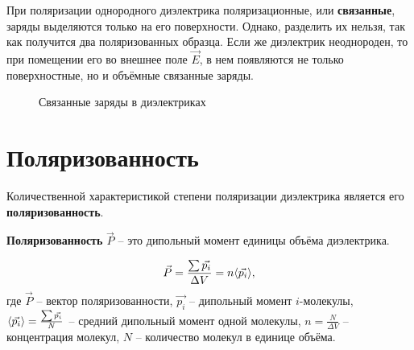     При поляризации однородного диэлектрика поляризационные, или
    \textbf{связанные}, заряды выделяются только на его поверхности.
    Однако, разделить их нельзя, так как получится два поляризованных образца.
    Если же диэлектрик неоднороден, то при помещении его во внешнее поле
    \( \vec{E} \), в нем появляются не только поверхностные, но и объёмные
    связанные заряды.
    \begin{figure}[b!]
        \center
        \hfill
        \caption{Связанные заряды в диэлектриках}
    \end{figure}
\section{Поляризованность}
    
    Количественной характеристикой степени поляризации диэлектрика является его
    \textbf{поляризованность}.
    
    \begin{definition}
        \textbf{Поляризованность} \( \vec{P} \) -- это дипольный момент единицы
        объёма диэлектрика.
    \end{definition}
    \begin{equation}
        \vec{P} = \frac{\sum \vec{p_i}}{\Delta V} = n \langle\vec{p_i}\rangle,
    \end{equation}
    где \( \vec{P} \) -- вектор поляризованности, \( \vec{p_i} \) -- дипольный
    момент \( i \)-молекулы,
    \( \langle\vec{p_i}\rangle = \frac{\sum \vec{p_i}}{N} \) -- средний дипольный
    момент одной молекулы, \( n = \frac{N}{\Delta V} \) -- концентрация молекул,
    \( N \) -- количество молекул в единице объёма.
    
